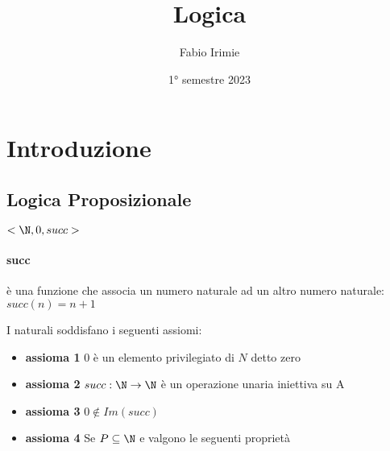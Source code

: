 \documentclass{article}
\title{Logica}
\author{Fabio Irimie}
\date{1° semestre 2023}
\begin{document}
\maketitle
\tableofcontents
\section{Introduzione}
\subsection{Logica Proposizionale}
$<\N, 0, succ>$
\paragraph{succ} è una funzione che associa un numero naturale ad un altro numero naturale: $succ(n) = n + 1$

I naturali soddisfano i seguenti assiomi:
\begin{itemize}
\item \textbf{assioma 1} 0 è un elemento privilegiato di $N$ detto zero
\item \textbf{assioma 2} $succ: \N \to \N$ è un operazione unaria iniettiva su A
\item \textbf{assioma 3} $0 \notin Im(succ)$
\item \textbf{assioma 4} Se $P \subseteq \N$ e valgono le seguenti proprietà
\end{itemize}
\end{document}
